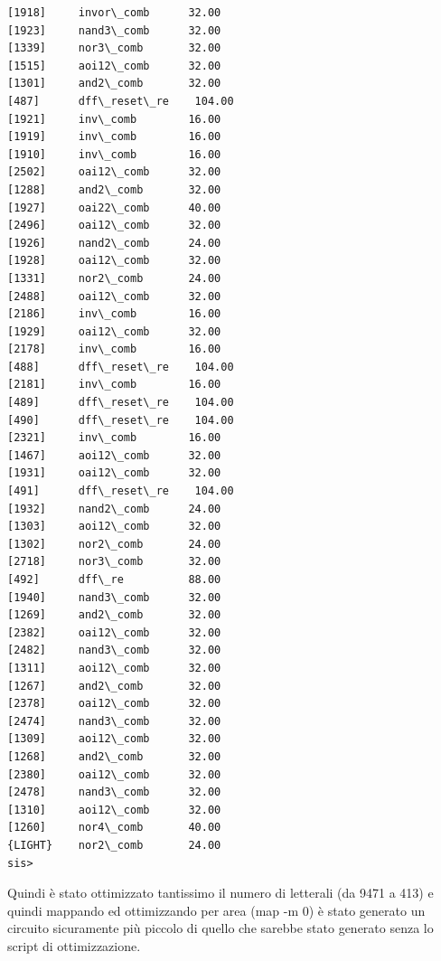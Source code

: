 \documentclass[a4paper,titlepage]{book}
\begin{document}
\begin{lstlisting}
[1918]     invor\_comb      32.00	
[1923]     nand3\_comb      32.00	
[1339]     nor3\_comb       32.00	
[1515]     aoi12\_comb      32.00	
[1301]     and2\_comb       32.00	
[487]      dff\_reset\_re    104.00	
[1921]     inv\_comb        16.00	
[1919]     inv\_comb        16.00	
[1910]     inv\_comb        16.00	
[2502]     oai12\_comb      32.00	
[1288]     and2\_comb       32.00	
[1927]     oai22\_comb      40.00	
[2496]     oai12\_comb      32.00	
[1926]     nand2\_comb      24.00	
[1928]     oai12\_comb      32.00	
[1331]     nor2\_comb       24.00	
[2488]     oai12\_comb      32.00	
[2186]     inv\_comb        16.00	
[1929]     oai12\_comb      32.00	
[2178]     inv\_comb        16.00	
[488]      dff\_reset\_re    104.00	
[2181]     inv\_comb        16.00	
[489]      dff\_reset\_re    104.00	
[490]      dff\_reset\_re    104.00	
[2321]     inv\_comb        16.00	
[1467]     aoi12\_comb      32.00	
[1931]     oai12\_comb      32.00	
[491]      dff\_reset\_re    104.00	
[1932]     nand2\_comb      24.00	
[1303]     aoi12\_comb      32.00	
[1302]     nor2\_comb       24.00	
[2718]     nor3\_comb       32.00	
[492]      dff\_re          88.00	
[1940]     nand3\_comb      32.00	
[1269]     and2\_comb       32.00	
[2382]     oai12\_comb      32.00	
[2482]     nand3\_comb      32.00	
[1311]     aoi12\_comb      32.00	
[1267]     and2\_comb       32.00	
[2378]     oai12\_comb      32.00	
[2474]     nand3\_comb      32.00	
[1309]     aoi12\_comb      32.00	
[1268]     and2\_comb       32.00	
[2380]     oai12\_comb      32.00	
[2478]     nand3\_comb      32.00	
[1310]     aoi12\_comb      32.00	
[1260]     nor4\_comb       40.00	
{LIGHT}    nor2\_comb       24.00
sis>
\end{lstlisting}

Quindi è stato ottimizzato tantissimo il numero di letterali (da 9471 a 413) e quindi mappando ed ottimizzando per area (map -m 0) è stato generato un circuito sicuramente più piccolo di quello che sarebbe stato generato senza lo script di ottimizzazione.
\end{document}
